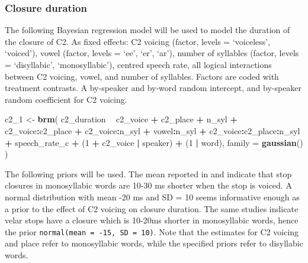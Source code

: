 \documentclass[11pt,]{article}
\newenvironment{Shaded}{\begin{snugshade}}{\end{snugshade}}
\newcommand{\DataTypeTok}[1]{\textcolor[rgb]{0.13,0.29,0.53}{#1}}
\newcommand{\DecValTok}[1]{\textcolor[rgb]{0.00,0.00,0.81}{#1}}
\newcommand{\KeywordTok}[1]{\textcolor[rgb]{0.13,0.29,0.53}{\textbf{#1}}}
\newcommand{\NormalTok}[1]{#1}
\newcommand{\OperatorTok}[1]{\textcolor[rgb]{0.81,0.36,0.00}{\textbf{#1}}}
\newcommand{\StringTok}[1]{\textcolor[rgb]{0.31,0.60,0.02}{#1}}
\begin{document}
\hypertarget{closure-duration}{%
\subsubsection{Closure duration}\label{closure-duration}}

\label{s:closure}

The following Bayesian regression model will be used to model the
duration of the closure of C2. As fixed effects: C2 voicing (factor,
levels = `voiceless', `voiced'), vowel (factor, levels = `ee', `er',
`ar'), number of syllables (factor, levels = `disyllabic',
`monosyllabic'), centred speech rate, all logical interactions between
C2 voicing, vowel, and number of syllables. Factors are coded with
treatment contrasts. A by-speaker and by-word random intercept, and
by-speaker random coefficient for C2 voicing.

\begin{Shaded}
\begin{Highlighting}[]
\NormalTok{c2_}\DecValTok{1}\NormalTok{ <-}\StringTok{ }\KeywordTok{brm}\NormalTok{(}
\NormalTok{  c2_duration }\OperatorTok{~}
\StringTok{    }\NormalTok{c2_voice }\OperatorTok{+}
\StringTok{    }\NormalTok{c2_place }\OperatorTok{+}
\StringTok{    }\NormalTok{n_syl }\OperatorTok{+}
\StringTok{    }\NormalTok{c2_voice}\OperatorTok{:}\NormalTok{c2_place }\OperatorTok{+}
\StringTok{    }\NormalTok{c2_voice}\OperatorTok{:}\NormalTok{n_syl }\OperatorTok{+}
\StringTok{    }\NormalTok{vowel}\OperatorTok{:}\NormalTok{n_syl }\OperatorTok{+}
\StringTok{    }\NormalTok{c2_voice}\OperatorTok{:}\NormalTok{c2_place}\OperatorTok{:}\NormalTok{n_syl }\OperatorTok{+}
\StringTok{    }\NormalTok{speech_rate_c }\OperatorTok{+}
\StringTok{    }\NormalTok{(}\DecValTok{1} \OperatorTok{+}\StringTok{ }\NormalTok{c2_voice }\OperatorTok{|}\StringTok{ }\NormalTok{speaker) }\OperatorTok{+}
\StringTok{    }\NormalTok{(}\DecValTok{1} \OperatorTok{|}\StringTok{ }\NormalTok{word),}
  \DataTypeTok{family =} \KeywordTok{gaussian}\NormalTok{()}
\NormalTok{)}
\end{Highlighting}
\end{Shaded}

The following priors will be used. The mean reported in
\citet{sharf1962} and \citet{luce1985} indicate that stop closures in
monosyllabic words are 10-30 ms shorter when the stop is voiced. A
normal distribution with mean -20 ms and SD = 10 seems informative
enough as a prior to the effect of C2 voicing on closure duration. The
same studies indicate velar stops have a closure which is 10-20ms
shorter in monosyllabic words, hence the prior
\texttt{normal(mean\ =\ -15,\ SD\ =\ 10)}. Note that the estimates for
C2 voicing and place refer to monosyllabic words, while the specified
priors refer to disyllabic words.
\end{document}
